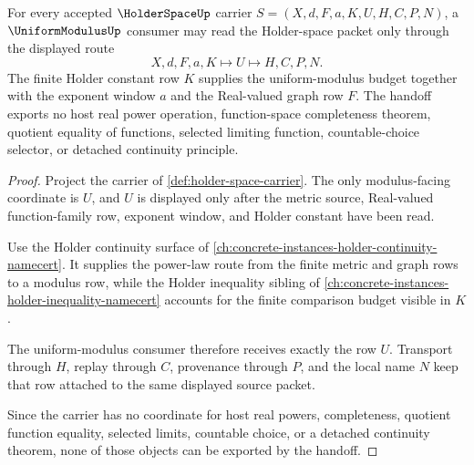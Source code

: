 \begin{theorem}
\label{thm:holder-space-uniform-modulus-route}
For every accepted $\HolderSpaceUp$ carrier $S=(X,d,F,a,K,U,H,C,P,N)$, a $\UniformModulusUp$ consumer may read the Holder-space packet only through the displayed route
$$
X,d,F,a,K \longmapsto U \longmapsto H,C,P,N .
$$
The finite Holder constant row $K$ supplies the uniform-modulus budget together with the exponent window $a$ and the Real-valued graph row $F$. The handoff exports no host real power operation, function-space completeness theorem, quotient equality of functions, selected limiting function, countable-choice selector, or detached continuity principle.
\end{theorem}
\begin{proof}
Project the carrier of \autoref{def:holder-space-carrier}. The only modulus-facing coordinate is $U$, and $U$ is displayed only after the metric source, Real-valued function-family row, exponent window, and Holder constant have been read.

Use the Holder continuity surface of \autoref{ch:concrete-instances-holder-continuity-namecert}. It supplies the power-law route from the finite metric and graph rows to a modulus row, while the Holder inequality sibling of \autoref{ch:concrete-instances-holder-inequality-namecert} accounts for the finite comparison budget visible in $K$.

The uniform-modulus consumer therefore receives exactly the row $U$. Transport through $H$, replay through $C$, provenance through $P$, and the local name $N$ keep that row attached to the same displayed source packet.

Since the carrier has no coordinate for host real powers, completeness, quotient function equality, selected limits, countable choice, or a detached continuity theorem, none of those objects can be exported by the handoff.
\end{proof}


\begin{closurestatus}{\HolderSpaceUp}
  \theoryclosure{\seedClosure}
  \formalstatus{\unformalizedV}
\end{closurestatus}
